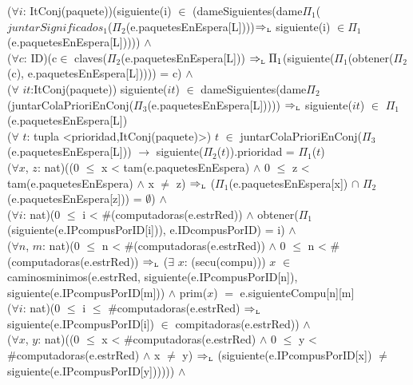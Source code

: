 \begin{Representacion}
{			($\forall i$: ItConj(paquete))(siguiente(i) $\in$ (dameSiguientes(dame$\Pi_1$($juntarSignificados_1$($\Pi_2$(e.paquetesEnEspera[L])))$\Rightarrow_{\mathrm{\scriptscriptstyle{L}}}$ siguiente(i) $\in \Pi_1$(e.paquetesEnEspera[L])))) $\land$ \\

			($\forall c$: ID)(c$\in$ claves($\Pi_2$(e.paquetesEnEspera[L])) $\Rightarrow_{\mathrm{\scriptscriptstyle{L}}} \Pi_1$(siguiente($\Pi_1$(obtener($\Pi_2$(c), e.paquetesEnEspera[L])))) = c) $\land$ \\

      ($\forall$ $it$:ItConj(paquete)) siguiente($it$) $\in$ dameSiguientes(dame$\Pi_2$(juntarColaPrioriEnConj($\Pi_3$(e.paquetesEnEspera[L])))) $\Rightarrow_{\mathrm{\scriptscriptstyle{L}}}$ siguiente($it$) $\in$ $\Pi_1$(e.paquetesEnEspera[L]) \\

			($\forall$ $t$: tupla <prioridad,ItConj(paquete)>) $t$ $\in$ juntarColaPrioriEnConj($\Pi_3$(e.paquetesEnEspera[L])) $\rightarrow$ siguiente($\Pi_2$($t$)).prioridad = $\Pi_1$($t$) \\

    ($\forall x$, $z$: nat)((0 $\leq$ x < tam(e.paquetesEnEspera) $\land$ 0 $\leq$ z < tam(e.paquetesEnEspera) $\land$ x $\neq$ z) $\Rightarrow_{\mathrm{\scriptscriptstyle{L}}}$ ($\Pi_1$(e.paquetesEnEspera[x]) $\cap$ $\Pi_2$(e.paquetesEnEspera[z])) = $\emptyset$) $\land$ \\

		($\forall i$: nat)(0 $\leq$ i < \#(computadoras(e.estrRed)) $\land$ obtener($\Pi_1$(siguiente(e.IPcompusPorID[i])), e.IDcompusPorID) = i) $\land$ \\

		($\forall n$, $m$: nat)(0 $\leq$ n < \#(computadoras(e.estrRed)) $\land$ 0 $\leq$ n < \#(computadoras(e.estrRed)) $\Rightarrow_{\mathrm{\scriptscriptstyle{L}}}$ ($\exists$ $x$: (secu(compu))) $x$ $\in$ caminosminimos(e.estrRed, siguiente(e.IPcompusPorID[n]), siguiente(e.IPcompusPorID[m])) $\land$ prim($x$) $=$ e.siguienteCompu[n][m] \\

    ($\forall i$: nat)(0 $\leq$ i $\leq$ \#computadoras(e.estrRed) $\Rightarrow_{\mathrm{\scriptscriptstyle{L}}}$ siguiente(e.IPcompusPorID[i]) $\in$ compitadoras(e.estrRed)) $\land$ \\

    ($\forall x$, $y$: nat)((0 $\leq$ x < \#computadoras(e.estrRed) $\land$ 0 $\leq$ y < \#computadoras(e.estrRed) $\land$ x $\neq$ y) $\Rightarrow_{\mathrm{\scriptscriptstyle{L}}}$ (siguiente(e.IPcompusPorID[x]) $\neq$ siguiente(e.IPcompusPorID[y]))))) $\land$ \\

}
\end{Representacion}

